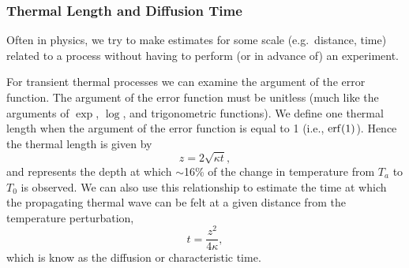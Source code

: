 \subsubsection{Thermal Length and Diffusion Time}
Often in physics, we try to make estimates for some scale (e.g.\ distance, time) related to a process without having to perform (or in advance of) an experiment.

For transient thermal processes we can examine the argument of the error function.  The argument of the error function must be unitless (much like the arguments of $\exp$, $\log$, and trigonometric functions).  We define one thermal length when the argument of the error function is equal to 1 (i.e., $\erf (1)$).  Hence the thermal length is given by
\begin{equation}
  z = 2 \sqrt{\kappa t},
\end{equation}
and represents the depth at which $\sim$16\% of the change in temperature from $T_{a}$ to $T_0$ is observed.  We can also use this relationship to estimate the time at which the propagating thermal wave can be felt at a given distance from the temperature perturbation,
\begin{equation}
    t = \frac{z^2}{4 \kappa} ,
\end{equation}
which is know as the diffusion or characteristic time.

